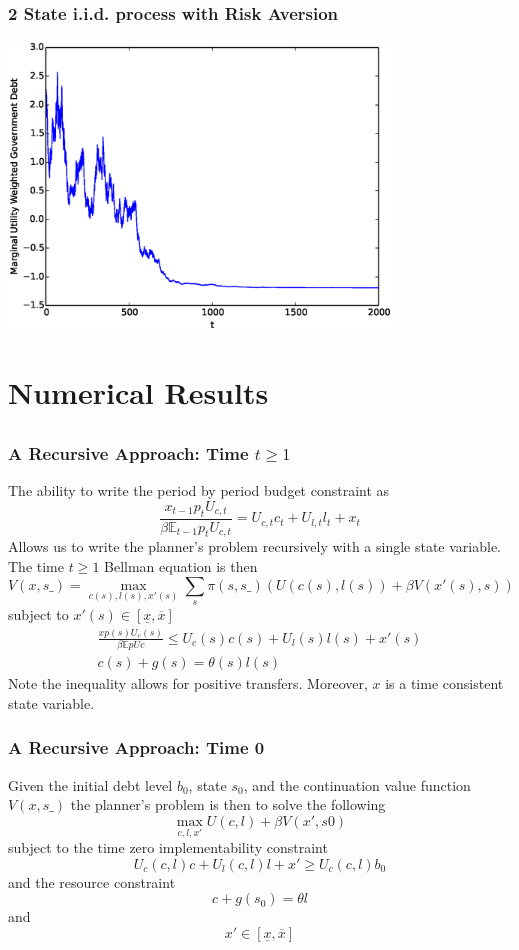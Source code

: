\documentclass{beamer}
\newcommand{\EE}{\mathbb E}
\begin{document}
\begin{frame}
	\frametitle{2 State i.i.d. process with Risk Aversion}
	\begin{center}
	\includegraphics[width=4in]{Images/2stateiid.eps}
	\end{center}
\end{frame}
  
\section{Numerical Results}
\subsection{}

 \begin{frame}
	\frametitle{A Recursive Approach: Time $t\geq 1$ }
	The ability to write the period by period budget constraint as 
	\[
		\frac{x_{t-1} p_t U_{c,t}}{\beta \EE_{t-1} p_t U_{c,t}}  = U_{c,t}c_t+U_{l,t} l_t + x_t
	\]Allows us to write the planner's problem recursively with a single state variable.  The time $t\geq 1$  Bellman equation is then
	\[
		V(x,s\_) = \max_{c(s),l(s),x'(s)} \sum_s \pi(s,s\_)\left(U(c(s),l(s)) + \beta V(x'(s),s)\right)
	\]subject to $x'(s)\in [\underline x,\overline x]$
	\begin{align*}
		\frac{x p(s) U_c(s)}{\beta\EE pUc} \leq U_c(s)c(s)+U_l(s)l(s) + x'(s)\\
		c(s) + g(s) = \theta(s)l(s)
	\end{align*}  Note the inequality allows for positive transfers.  Moreover, $x$ is a time consistent state variable.
 \end{frame}

\begin{frame}
	\frametitle{A Recursive Approach: Time 0}
	Given the initial debt level $b_0$, state $s_0$,  and the continuation value function $V(x,s\_)$ the planner's problem is then to solve the following
	\[
		\max_{c,l,x'} U(c,l) +\beta V(x',s0)
	\]subject to the time zero implementability constraint
	\[
		U_{c}(c,l)c + U_l(c,l) l + x' \geq U_c(c,l) b_0
	\]and the resource constraint
	\[
		c+ g(s_0) = \theta l
	\]and
	\[
		x' \in [\underline x,\overline x]
	\]
\end{frame}
\end{document}
